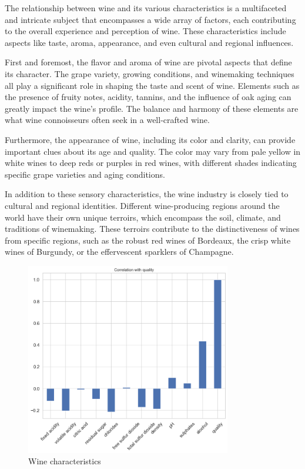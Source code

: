 \documentclass{report}
\begin{document}
\pagebreak

The relationship between wine and its various characteristics is a multifaceted and intricate subject that encompasses a wide array of factors, each contributing to the overall experience and perception of wine. These characteristics include aspects like taste, aroma, appearance, and even cultural and regional influences.

First and foremost, the flavor and aroma of wine are pivotal aspects that define its character. The grape variety, growing conditions, and winemaking techniques all play a significant role in shaping the taste and scent of wine. Elements such as the presence of fruity notes, acidity, tannins, and the influence of oak aging can greatly impact the wine's profile. The balance and harmony of these elements are what wine connoisseurs often seek in a well-crafted wine.

Furthermore, the appearance of wine, including its color and clarity, can provide important clues about its age and quality. The color may vary from pale yellow in white wines to deep reds or purples in red wines, with different shades indicating specific grape varieties and aging conditions.

In addition to these sensory characteristics, the wine industry is closely tied to cultural and regional identities. Different wine-producing regions around the world have their own unique terroirs, which encompass the soil, climate, and traditions of winemaking. These terroirs contribute to the distinctiveness of wines from specific regions, such as the robust red wines of Bordeaux, the crisp white wines of Burgundy, or the effervescent sparklers of Champagne.


\begin{figure}
    \centering
    \includegraphics[width=0.8\textwidth]{images/18.png}
    \caption{Wine characteristics}
    \label{fig:Wine characteristics}
\end{figure}
\end{document}
